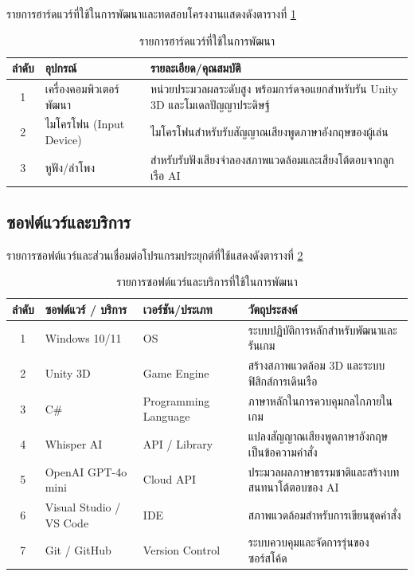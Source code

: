 รายการฮาร์ดแวร์ที่ใช้ในการพัฒนาและทดสอบโครงงานแสดงดังตารางที่ \ref{tab:hardware}

\begin{table}[H]
\centering
\caption{รายการฮาร์ดแวร์ที่ใช้ในการพัฒนา}
\label{tab:hardware}
\begin{tabular}{|c|l|p{8.5cm}|}
\hline
\textbf{ลำดับ} & \textbf{อุปกรณ์} & \textbf{รายละเอียด/คุณสมบัติ} \\
\hline
1 & เครื่องคอมพิวเตอร์พัฒนา & หน่วยประมวลผลระดับสูง พร้อมการ์ดจอแยกสำหรับรัน Unity 3D และโมเดลปัญญาประดิษฐ์ \\ \hline
2 & ไมโครโฟน (Input Device) & ไมโครโฟนสำหรับรับสัญญาณเสียงพูดภาษาอังกฤษของผู้เล่น \\ \hline
3 & หูฟัง/ลำโพง & สำหรับรับฟังเสียงจำลองสภาพแวดล้อมและเสียงโต้ตอบจากลูกเรือ AI \\
\hline
\end{tabular}
\end{table}

\subsection{ซอฟต์แวร์และบริการ}

รายการซอฟต์แวร์และส่วนเชื่อมต่อโปรแกรมประยุกต์ที่ใช้แสดงดังตารางที่ \ref{tab:software}

\begin{table}[H]
\centering
\caption{รายการซอฟต์แวร์และบริการที่ใช้ในการพัฒนา}
\label{tab:software}
\begin{tabular}{|c|l|l|p{5.5cm}|}
\hline
\textbf{ลำดับ} & \textbf{ซอฟต์แวร์ / บริการ} & \textbf{เวอร์ชัน/ประเภท} & \textbf{วัตถุประสงค์} \\
\hline
1 & Windows 10/11 & OS & ระบบปฏิบัติการหลักสำหรับพัฒนาและรันเกม \\ \hline
2 & Unity 3D & Game Engine & สร้างสภาพแวดล้อม 3D และระบบฟิสิกส์การเดินเรือ \\ \hline
3 & C\# & Programming Language & ภาษาหลักในการควบคุมกลไกภายในเกม \\ \hline
4 & Whisper AI & API / Library & แปลงสัญญาณเสียงพูดภาษาอังกฤษเป็นข้อความคำสั่ง \\ \hline
5 & OpenAI GPT-4o mini & Cloud API & ประมวลผลภาษาธรรมชาติและสร้างบทสนทนาโต้ตอบของ AI\\ \hline
6 & Visual Studio / VS Code & IDE & สภาพแวดล้อมสำหรับการเขียนชุดคำสั่ง \\ \hline
7 & Git / GitHub & Version Control & ระบบควบคุมและจัดการรุ่นของซอร์สโค้ด \\
\hline
\end{tabular}
\end{table}

